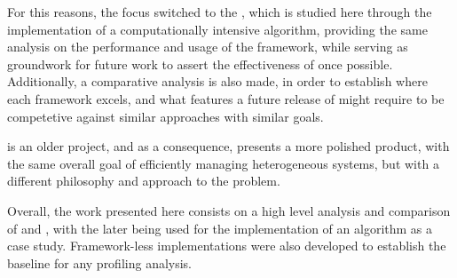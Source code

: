 \documentclass[main.tex]{subfiles}
\begin{document}
 For this reasons, the focus switched to the \starpu, which is studied here through the implementation of a computationally intensive algorithm, providing the same analysis on the performance and usage of the framework, while serving as groundwork for future work to assert the effectiveness of \gama once possible. Additionally, a comparative analysis is also made, in order to establish where each framework excels, and what features a future release of \gama might require to be competetive against similar approaches with similar goals.

\starpu is an older project, and as a consequence, presents a more polished product, with the same overall goal of efficiently managing heterogeneous systems, but with a different philosophy and approach to the problem.

Overall, the work presented here consists on a high level analysis and comparison of \gama and \starpu, with the later being used for the implementation of an algorithm as a case study. Framework-less implementations were also developed to establish the baseline for any profiling analysis.

\end{document}
